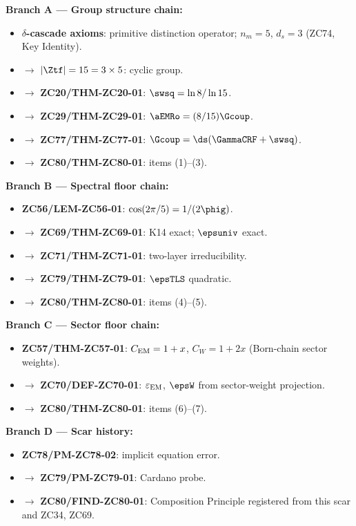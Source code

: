 \documentclass[12pt, a4paper]{article}
\renewcommand{\epsEM}{\varepsilon_{\rm EM}}
\begin{document}
\begin{genealogybox}[title={How ZC80's Key Objects Trace Back}]

\textbf{Branch A --- Group structure chain:}
\begin{itemize}[leftmargin=2em, noitemsep]
  \item \textbf{$\delta$-cascade axioms}: primitive distinction
    operator; $n_m = 5$, $d_s = 3$ (ZC74, Key Identity).
  \item $\to$ \textbf{$|\Ztf| = 15 = 3\times5$}: cyclic group.
  \item $\to$ \textbf{ZC20/THM-ZC20-01}: $\swsq = \ln8/\ln15$.
  \item $\to$ \textbf{ZC29/THM-ZC29-01}: $\aEMRo = (8/15)\Gcoup$.
  \item $\to$ \textbf{ZC77/THM-ZC77-01}: $\Gcoup = \ds(\GammaCRF + \swsq)$.
  \item $\to$ \textbf{ZC80/THM-ZC80-01}: items (1)--(3).
\end{itemize}

\textbf{Branch B --- Spectral floor chain:}
\begin{itemize}[leftmargin=2em, noitemsep]
  \item \textbf{ZC56/LEM-ZC56-01}: $\cos(2\pi/5) = 1/(2\phig)$.
  \item $\to$ \textbf{ZC69/THM-ZC69-01}: K14 exact;
    $\epsuniv$ exact.
  \item $\to$ \textbf{ZC71/THM-ZC71-01}: two-layer irreducibility.
  \item $\to$ \textbf{ZC79/THM-ZC79-01}: $\epsTLS$ quadratic.
  \item $\to$ \textbf{ZC80/THM-ZC80-01}: items (4)--(5).
\end{itemize}

\textbf{Branch C --- Sector floor chain:}
\begin{itemize}[leftmargin=2em, noitemsep]
  \item \textbf{ZC57/THM-ZC57-01}: $C_{\rm EM} = 1+x$,
    $C_W = 1+2x$ (Born-chain sector weights).
  \item $\to$ \textbf{ZC70/DEF-ZC70-01}: $\epsEM$, $\epsW$
    from sector-weight projection.
  \item $\to$ \textbf{ZC80/THM-ZC80-01}: items (6)--(7).
\end{itemize}

\textbf{Branch D --- Scar history:}
\begin{itemize}[leftmargin=2em, noitemsep]
  \item \textbf{ZC78/PM-ZC78-02}: implicit equation error.
  \item $\to$ \textbf{ZC79/PM-ZC79-01}: Cardano probe.
  \item $\to$ \textbf{ZC80/FIND-ZC80-01}: Composition Principle
    registered from this scar and ZC34, ZC69.
\end{itemize}


\end{genealogybox}
\end{document}

